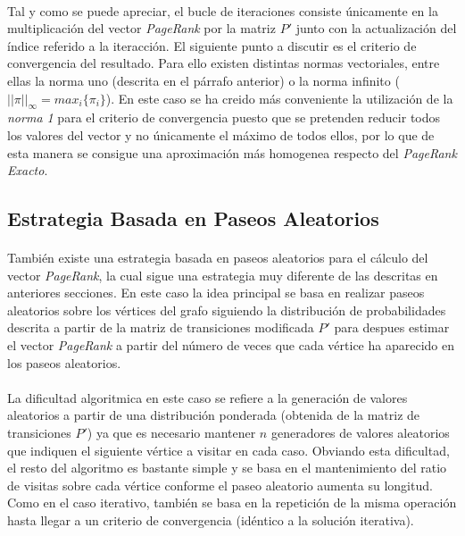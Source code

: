 \documentclass{subfiles}
\begin{document}
        \paragraph{}
        Tal y como se puede apreciar, el bucle de iteraciones consiste únicamente en la multiplicación del vector \emph{PageRank} por la matriz $P'$ junto con la actualización del índice referido a la iteracción. El siguiente punto a discutir es el criterio de convergencia del resultado. Para ello existen distintas normas vectoriales, entre ellas la norma uno (descrita en el párrafo anterior) o la norma infinito ($||\pi||_{\infty}=max_i\{\pi_i\}$). En este caso se ha creido más conveniente la utilización de la \emph{norma 1} para el criterio de convergencia puesto que se pretenden reducir todos los valores del vector y no únicamente el máximo de todos ellos, por lo que de esta manera se consigue una aproximación más homogenea respecto  del \emph{PageRank Exacto}.

      \subsection{Estrategia Basada en Paseos Aleatorios}
      \label{sec:pagerank_algorithm_random_walks}

        \paragraph{}
        También existe una estrategia basada en paseos aleatorios para el cálculo del vector \emph{PageRank}, la cual sigue una estrategia muy diferente de las descritas en anteriores secciones. En este caso la idea principal se basa en realizar paseos aleatorios sobre los vértices del grafo siguiendo la distribución de probabilidades descrita a partir de la matriz de transiciones modificada $P'$ para despues estimar el vector \emph{PageRank} a partir del número de veces que cada vértice ha aparecido en los paseos aleatorios.

        \paragraph{}
        La dificultad algoritmica en este caso se refiere a la generación de valores aleatorios a partir de una distribución ponderada (obtenida de la matriz de transiciones $P'$) ya que es necesario mantener $n$ generadores de valores aleatorios que indiquen el siguiente vértice a visitar en cada caso. Obviando esta dificultad, el resto del algoritmo es bastante simple y se basa en el mantenimiento del ratio de visitas sobre cada vértice conforme el paseo aleatorio aumenta su longitud. Como en el caso iterativo, también se basa en la repetición de la misma operación hasta llegar a un criterio de convergencia (idéntico a la solución iterativa).
\end{document}
